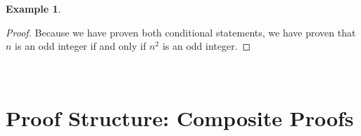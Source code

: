 \documentclass{book}
\theoremstyle{definition}
\newtheorem{example}{Example}[definition]
\theoremstyle{remark}
\begin{document}
\begin{example}
\begin{proof}
    Because we have proven both conditional statements, we have proven that $n$ is an odd integer if and only if $n^2$ is an odd integer.
\end{proof}
\end{example}


\newpage
\

































\newpage
\section{Proof Structure: Composite Proofs}
\end{document}
